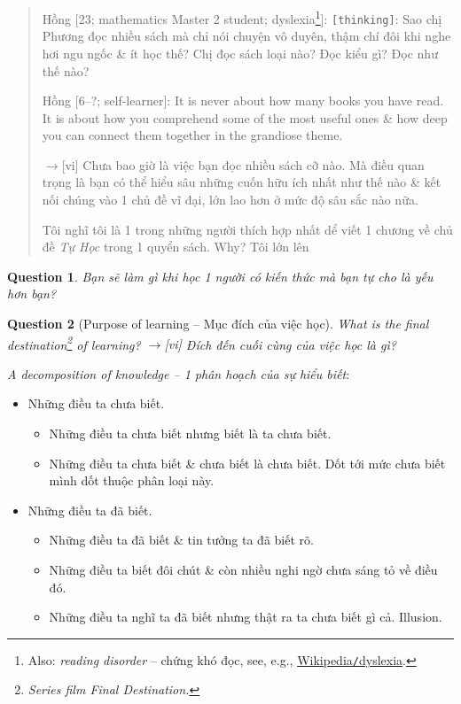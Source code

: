 \documentclass[12pt,oneside]{book}
\newtheorem{question}{Question}
\begin{document}
\begin{quote}
	{\sf Hồng [23; mathematics Master 2 student; dyslexia\footnote{Also: {\it reading disorder} -- chứng khó đọc, see, e.g., \href{https://en.wikipedia.org/wiki/Dyslexia}{Wikipedia{\tt/}dyslexia}.}]}: {\tt[thinking]}: Sao chị {\sf Phương} đọc nhiều sách mà chỉ nói chuyện vô duyên, thậm chí đôi khi nghe hơi ngu ngốc \& ít học thế? Chị đọc sách loại nào? Đọc kiểu gì? Đọc như thế nào?

	{\sf Hồng [6--?; self-learner]}: It is never about how many books you have read. It is about how you comprehend some of the most useful ones \& how deep you can connect them together in the grandiose theme.
	
	{\sf[en]$\to$[vi]} Chưa bao giờ là việc bạn đọc nhiều sách cỡ nào. Mà điều quan trọng là bạn có thể hiểu sâu những cuốn hữu ích nhất như thế nào \& kết nối chúng vào 1 chủ đề vĩ đại, lớn lao hơn ở mức độ sâu sắc nào nữa.
	
	Tôi nghĩ tôi là 1 trong những người thích hợp nhất dể viết 1 chương về chủ đề {\it Tự Học} trong 1 quyển sách. Why? Tôi lớn lên
\end{quote}

\begin{question}
	Bạn sẽ làm gì khi học 1 người có kiến thức mà bạn tự cho là yếu hơn bạn?
\end{question}

\begin{question}[Purpose of learning -- Mục đích của việc học]
	What is the final destination\footnote{Series film Final Destination.} of learning? {\sf[en]$\to$[vi]} Đích đến cuối cùng của việc học là gì?
\end{question}

{\it A decomposition of knowledge -- 1 phân hoạch của sự hiểu biết}:
\begin{itemize}
	\item Những điều ta chưa biết.
	\begin{itemize}
		\item Những điều ta chưa biết nhưng biết là ta chưa biết.
		\item Những điều ta chưa biết \& chưa biết là chưa biết. Dốt tới mức chưa biết mình dốt thuộc phân loại này.
	\end{itemize}
	\item Những điều ta đã biết.
	\begin{itemize}
		\item Những điều ta đã biết \& tin tưởng ta đã biết rõ.
		\item Những điều ta biết đôi chút \& còn nhiều nghi ngờ chưa sáng tỏ về điều đó.
		\item Những điều ta nghĩ ta đã biết nhưng thật ra ta chưa biết gì cả. Illusion.
	\end{itemize}
\end{itemize}
\end{document}
